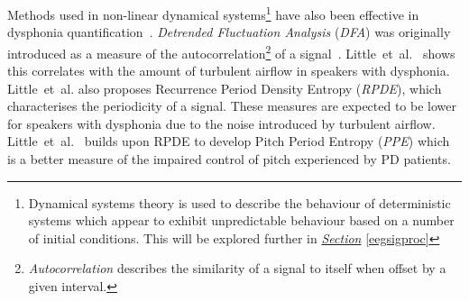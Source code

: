 \documentclass{article}
\begin{document}
\label{dfadescription}
Methods used in non-linear dynamical systems\footnote{Dynamical systems theory is used to describe the behaviour of deterministic systems which appear to exhibit unpredictable behaviour based on a number of initial conditions. This will be explored further in \textit{\hyperref[eegsigproc]{Section}} \ref{eegsigproc}} have also been effective in dysphonia quantification~\cite{splittlenonlinear2007}. \textit{Detrended Fluctuation Analysis} (\emph{DFA}) was originally introduced as a measure of the autocorrelation\footnote{\emph{Autocorrelation} describes the similarity of a signal to itself when offset by a given interval.} of a signal~\cite{dfa}. Little~et~al.~\cite{splittlenonlinear2007} shows this correlates with the amount of turbulent airflow in speakers with dysphonia. Little~et~al. also proposes Recurrence Period Density Entropy (\emph{RPDE}), which characterises the periodicity of a signal. These measures are expected to be lower for speakers with dysphonia due to the noise introduced by turbulent airflow. Little~et~al.~\cite{splittledysphonia2009} builds upon RPDE to develop Pitch Period Entropy (\emph{PPE}) which is a better measure of the impaired control of pitch experienced by PD patients.
\end{document}
